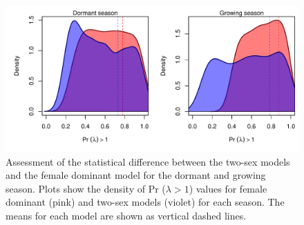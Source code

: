\documentclass[12pt]{article}\usepackage[]{graphicx}\usepackage[dvipsnames]{xcolor}
\begin{document}
\begin{figure}[H]
	\begin{center}
		\includegraphics[width=0.99\linewidth]{Figures/Niche_overestimation.pdf}
		\caption{ Assessment of the statistical difference between the two-sex models and the female dominant model for the dormant and growing season. 
			Plots show the density of Pr ($\lambda > 1$) values for female dominant (pink) and two-sex models (violet) for each season. 
			The means for each model are shown as vertical dashed lines. }
		\label{Sup:Niche_overestimation}
	\end{center}
\end{figure}
\end{document}
